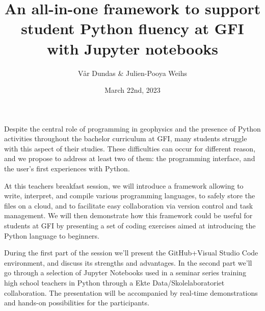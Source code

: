 \documentclass{article}
\title{
    An all-in-one framework to support student Python fluency at GFI with 
    Jupyter notebooks
    }
\date{March 22nd, 2023}
\author{Vår Dundas \& Julien-Pooya Weihs}
\begin{document}
\maketitle

Despite the central role of programming in geophysics and the presence of 
Python activities throughout the bachelor curriculum at GFI, many students 
struggle with this aspect of their studies. These difficulties can 
occur for different reason, and we propose to address at least two of them: 
the programming interface, and the user's first experiences with Python. 

At this teachers breakfast session, we will introduce a framework allowing to 
write, interpret, and compile various programming languages, to safely store 
the files on a cloud, and to facilitate easy collaboration via version control 
and task management. We will then demonstrate how this framework could be 
useful for students at GFI by presenting a set of coding exercises aimed at 
introducing the Python language to beginners.

During the first part of the session we'll present the GitHub+Visual Studio 
Code environment, and discuss its strengths and advantages. In the second part 
we'll go through a selection of Jupyter Notebooks used in a seminar series 
training high school teachers in Python through a Ekte Data/Skolelaboratoriet 
collaboration. The presentation will be accompanied by real-time 
demonstrations and hands-on possibilities for the participants.
\end{document}
